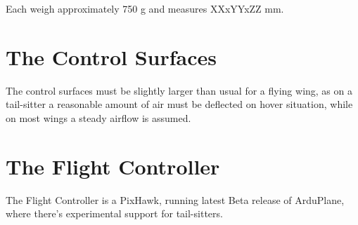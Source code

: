 Each weigh approximately 750 g and measures XXxYYxZZ mm.

\section{The Control Surfaces}

The control surfaces must be slightly larger than usual for a flying wing, as on a tail-sitter a reasonable amount of air must be deflected on hover situation, while on most wings a steady airflow is assumed.

\section{The Flight Controller}

The Flight Controller is a PixHawk, running latest Beta release of ArduPlane, where there's experimental support for tail-sitters.


